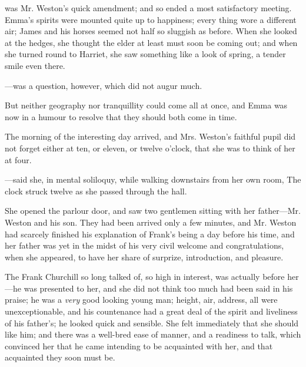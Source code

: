  was Mr. Weston's quick amendment; and so ended a most satisfactory meeting. Emma's spirits were mounted quite up to happiness; every thing wore a different air; James and his horses seemed not half so sluggish as before. When she looked at the hedges, she thought the elder at least must soon be coming out; and when she turned round to Harriet, she saw something like a look of spring, a tender smile even there.

---was a question, however, which did not augur much.

But neither geography nor tranquillity could come all at once, and Emma was now in a humour to resolve that they should both come in time.

The morning of the interesting day arrived, and Mrs. Weston's faithful pupil did not forget either at ten, or eleven, or twelve o'clock, that she was to think of her at four.

---said she, in mental soliloquy, while walking downstairs from her own room,  The clock struck twelve as she passed through the hall. 

She opened the parlour door, and saw two gentlemen sitting with her father---Mr. Weston and his son. They had been arrived only a few minutes, and Mr. Weston had scarcely finished his explanation of Frank's being a day before his time, and her father was yet in the midst of his very civil welcome and congratulations, when she appeared, to have her share of surprize, introduction, and pleasure.

The Frank Churchill so long talked of, so high in interest, was actually before her---he was presented to her, and she did not think too much had been said in his praise; he was a {\em very} good looking young man; height, air, address, all were unexceptionable, and his countenance had a great deal of the spirit and liveliness of his father's; he looked quick and sensible. She felt immediately that she should like him; and there was a well-bred ease of manner, and a readiness to talk, which convinced her that he came intending to be acquainted with her, and that acquainted they soon must be.

